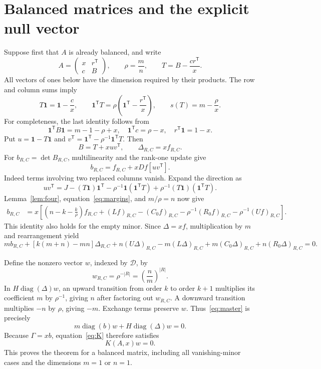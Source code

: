 \documentclass[11pt]{article}
\newcommand{\diag}{\operatorname{diag}}
\newcommand{\D}{\mathcal D}
\newcommand{\one}{\mathbf 1}
\begin{document}
\section{Balanced matrices and the explicit null vector}
Suppose first that $A$ is already balanced, and write
\[
 A=\begin{pmatrix}x&r^{\mathsf T}\\c&B\end{pmatrix},\qquad
 \rho=\frac{m}{n},\qquad T=B-\frac{cr^{\mathsf T}}x.
\]
All vectors of ones below have the dimension required by their products. The row and column sums imply
\begin{equation}\label{eq:margins}
 T\one=\one-\frac cx,\qquad
 \one^{\mathsf T}T=\rho\left(\one^{\mathsf T}-\frac{r^{\mathsf T}}x\right),\qquad
 s(T)=m-\frac\rho x.
\end{equation}
For completeness, the last identity follows from
\[
 \one^{\mathsf T}B\one=m-1-\rho+x,
 \quad \one^{\mathsf T}c=\rho-x,
 \quad r^{\mathsf T}\one=1-x.
\]
Put $u=\one-T\one$ and $v^{\mathsf T}=\one^{\mathsf T}-\rho^{-1}\one^{\mathsf T}T$. Then
\[
 B=T+xuv^{\mathsf T},\qquad \Delta_{R,C}=x f_{R,C}.
\]
For $b_{R,C}=\det B_{R,C}$, multilinearity and the rank-one update give
\begin{equation}\label{eq:rankone}
 b_{R,C}=f_{R,C}+x Df[uv^{\mathsf T}].
\end{equation}
Indeed terms involving two replaced columns vanish. Expand the direction as
\[
 uv^{\mathsf T}=J-(T\one)\one^{\mathsf T}
 -\rho^{-1}\one(\one^{\mathsf T}T)
 +\rho^{-1}(T\one)(\one^{\mathsf T}T).
\]
Lemma~\ref{lem:four}, equation~\eqref{eq:margins}, and $m/\rho=n$ now give
\begin{align}
 b_{R,C}
 &=x\left[\left(n-k-\frac{k}{\rho}\right)f_{R,C}
 +(Lf)_{R,C}-(C_0f)_{R,C}
 -\rho^{-1}(R_0f)_{R,C}-\rho^{-1}(Uf)_{R,C}\right].\label{eq:balance}
\end{align}
This identity also holds for the empty minor. Since $\Delta=xf$, multiplication by $m$ and rearrangement yield
\begin{equation}\label{eq:master}
 m b_{R,C}+[k(m+n)-mn]\Delta_{R,C}
 +n(U\Delta)_{R,C}-m(L\Delta)_{R,C}
 +m(C_0\Delta)_{R,C}+n(R_0\Delta)_{R,C}=0.
\end{equation}

Define the nonzero vector $w$, indexed by $\D$, by
\[
 w_{R,C}=\rho^{-|R|}=\left(\frac nm\right)^{|R|}.
\]
In $H\diag(\Delta)w$, an upward transition from order $k$ to order $k+1$ multiplies its coefficient $m$ by $\rho^{-1}$, giving $n$ after factoring out $w_{R,C}$. A downward transition multiplies $-n$ by $\rho$, giving $-m$. Exchange terms preserve $w$. Thus~\eqref{eq:master} is precisely
\[
 m\diag(b)w+H\diag(\Delta)w=0.
\]
Because $\Gamma=xb$, equation~\eqref{eq:K} therefore satisfies
\[
 \boxed{\ K(A,x)w=0.\ }
\]
This proves the theorem for a balanced matrix, including all vanishing-minor cases and the dimensions $m=1$ or $n=1$.
\end{document}
